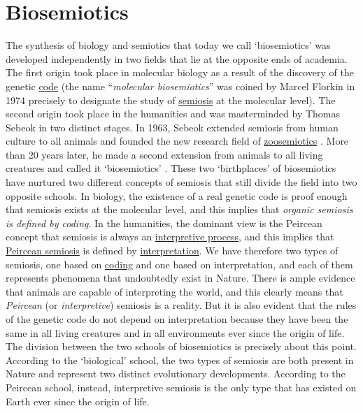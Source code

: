 \documentclass[12pt]{article}
\begin{document}
\section{Biosemiotics}
The synthesis of biology and semiotics that today we call `biosemiotics' was developed independently in two fields that lie at the opposite ends of academia. The first origin took place in molecular biology as a result of the discovery of the genetic \hyperlink{code}{code} (the name ``\textit{molecular biosemiotics}'' was coined by Marcel Florkin in 1974 \cite{florkin74:_molecular_biosemiotics} precisely to designate the study of \hyperlink{semiosis}{semiosis} at the molecular level). The second origin took place in the humanities and was masterminded by Thomas Sebeok in two distinct stages. In 1963, Sebeok extended semiosis from human culture to all animals and founded the new research field of  \hyperlink{zoosemiotics}{zoosemiotics} \cite{sebeok63:_communication}. More than 20 years later, he made a second extension from animals to all living creatures and called it `biosemiotics' \cite{anderson84_semiotic_perspective_on_science,sebeok92:_semiotic_web,sebeok01:_biosemiotics}. These two `birthplaces' of biosemiotics have nurtured two different concepts of semiosis that still divide the field into two opposite schools. In biology, the existence of a real genetic code is proof enough that semiosis exists at the molecular level, and this implies that \textit{organic semiosis is defined by coding}. In the humanities, the dominant view is the Peircean concept that semiosis is always an \hyperlink{interpretive_semiosis}{interpretive process}, and this implies that \hyperlink{peirce_model_of_semiosis}{Peircean semiosis} is defined by \hyperlink{interpretation}{interpretation}. We have therefore two types of semiosis, one based on \hyperlink{copying_and_coding}{coding} and one based on interpretation, and each of them represents phenomena that undoubtedly exist in Nature. There is ample evidence that animals are capable of interpreting the world, and this clearly means that \textit{Peircean} (or \textit{interpretive}) semiosis is a reality. But it is also evident that the rules of the genetic code do not depend on interpretation because they have been the same in all living creatures and in all environments ever since the origin of life. The division between the two schools of biosemiotics is precisely about this point. According to the `biological' school, the two types of semiosis are both present in Nature and represent two distinct evolutionary developments. According to the Peircean school, instead, interpretive semiosis is the only type that has existed on Earth ever since the origin of life. 
\hypertarget{brain}{}
\end{document}
